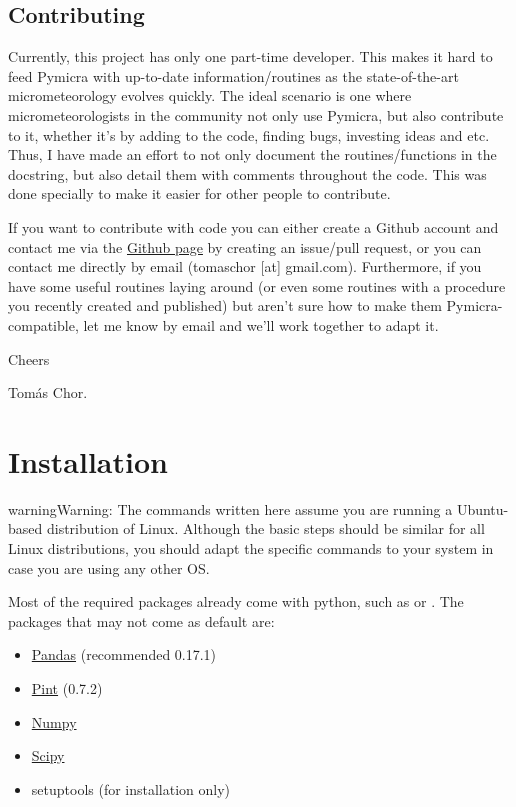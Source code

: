 \documentclass[a4paper,10pt,oneside]{sphinxmanual}
\begin{document}
\section{Contributing}
\label{intro:contributing}
Currently, this project has only one part-time developer. This makes it hard to
feed Pymicra with up-to-date information/routines as the state-of-the-art
micrometeorology evolves quickly. The ideal scenario is one where
micrometeorologists in the community not only use Pymicra, but also contribute
to it, whether it's by adding to the code, finding bugs, investing ideas and
etc. Thus, I have made an effort to not only document the routines/functions in
the docstring, but also detail them with comments throughout the code. This was
done specially to make it easier for other people to contribute.

If you want to contribute with code you can either create a Github account and
contact me via the \href{https://github.com/tomchor/pymicra}{Github page} by creating an issue/pull request, or you can
contact me directly by email (tomaschor {[}at{]} gmail.com). Furthermore, if you have some useful routines
laying around (or even some routines with a procedure you recently created and
published) but aren't sure how to make them Pymicra-compatible, let me know by
email and we'll work together to adapt it.

Cheers

Tomás Chor.


\chapter{Installation}
\label{install:installation}\label{install::doc}
\begin{notice}{warning}{Warning:}
The commands written here assume you are running a Ubuntu-based distribution of
Linux. Although the basic steps should be similar for all Linux distributions, you
should adapt the specific commands to your system in case you are using any other OS.
\end{notice}

Most of the required packages already come with python, such as  or
. The packages that may not come as default are:
\begin{itemize}
\item {} 
\href{http://pandas.pydata.org/}{Pandas} (recommended 0.17.1)

\item {} 
\href{https://pint.readthedocs.io/en/0.7.2/}{Pint} (0.7.2)

\item {} 
\href{http://www.numpy.org/}{Numpy}

\item {} 
\href{https://www.scipy.org/}{Scipy}

\item {} 
setuptools (for installation only)

\end{itemize}
\end{document}
